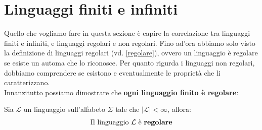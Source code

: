 \section{Linguaggi finiti e infiniti}
Quello che vogliamo fare in questa sezione è capire la correlazione tra linguaggi finiti e infiniti, e linguaggi
regolari e non regolari. Fino ad'ora abbiamo solo visto la definizione di linguaggi regolari (vd. \ref{regolare}), ovvero un linguaggio è regolare se esiste un
automa che lo riconosce. Per quanto rigurda i linguaggi non regolari, dobbiamo comprendere se esistono e eventualmente le proprietà che li caratterizzano.\\
Innanzitutto possiamo dimostrare che \textbf{ogni linguaggio finito è regolare}:\smallskip\\
\colorbox{SALZO}{\parbox{\dimexpr\linewidth-2\fboxsep}{\begin{theorem}
   Sia $\mathcal{L}$ un linguaggio sull'alfabeto $\Sigma $ tale che $|\mathcal{L}| < \infty$, allora:
   \[      \text{Il linguaggio } \mathcal{L} \text{ è \textbf{regolare}}        \]
\end{theorem}}}
